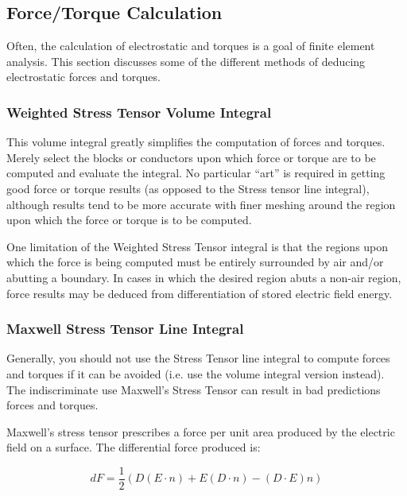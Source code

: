 \documentclass[12pt]{report}
\begin{document}
\subsection{Force/Torque Calculation} \label{forcetorquesection}

Often, the calculation of electrostatic and torques is a goal of
finite element analysis. This section discusses some of the
different methods of deducing electrostatic forces and torques.

\subsubsection{Weighted Stress Tensor Volume Integral}

This volume integral greatly simplifies the computation of forces and
torques. Merely select the blocks or conductors upon which force or torque
are to be computed and evaluate the integral. No particular ``art'' is
required in getting good force or torque results (as opposed to the Stress
tensor line integral), although results tend to be more accurate with finer
meshing around the region upon which the force or torque is to be computed.

One limitation of the Weighted Stress Tensor integral is that the regions
upon which the force is being computed must be entirely surrounded by air
and/or abutting a boundary. In cases in which the desired region abuts a
non-air region, force results may be deduced from differentiation of stored
electric field energy.

\subsubsection{Maxwell Stress Tensor Line Integral}

Generally, you should not use the Stress Tensor line integral to compute
forces and torques if it can be avoided (i.e. use the volume integral
version instead). The indiscriminate use Maxwell's Stress Tensor can result
in bad predictions forces and torques.

Maxwell's stress tensor prescribes a force per unit area produced by the
electric field on a surface. The differential force produced is:

\begin{equation}
\label{eq8}
dF = \frac{1}{2}\left( {D\left( {E \cdot n} \right) + E\left( {D \cdot n}
\right) - \left( {D \cdot E} \right)n} \right)
\end{equation}
\end{document}

